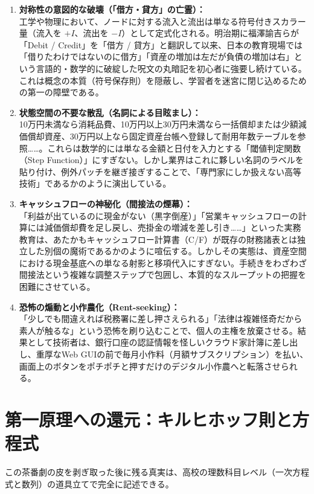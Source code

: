 \begin{enumerate}
    \item \textbf{対称性の意図的な破壊（「借方・貸方」の亡霊）：}\\
    工学や物理において、ノードに対する流入と流出は単なる符号付きスカラー量（流入を $+I$、流出を $-I$）として定式化される。明治期に福澤諭吉らが「Debit / Credit」を「借方 / 貸方」と翻訳して以来、日本の教育現場では「借りたわけではないのに借方」「資産の増加は左だが負債の増加は右」という言語的・数学的に破綻した呪文の丸暗記を初心者に強要し続けている。これは概念の本質（符号保存則）を隠蔽し、学習者を迷宮に閉じ込めるための第一の障壁である。

    \item \textbf{状態空間の不要な散乱（名詞による目眩まし）：}\\
    10万円未満なら消耗品費、10万円以上30万円未満なら一括償却または少額減価償却資産、30万円以上なら固定資産台帳へ登録して耐用年数テーブルを参照……。これらは数学的には単なる金額と日付を入力とする「閾値判定関数（Step Function）」にすぎない。しかし業界はこれに夥しい名詞のラベルを貼り付け、例外パッチを継ぎ接ぎすることで、「専門家にしか扱えない高等技術」であるかのように演出している。

    \item \textbf{キャッシュフローの神秘化（間接法の煙幕）：}\\
    「利益が出ているのに現金がない（黒字倒産）」「営業キャッシュフローの計算には減価償却費を足し戻し、売掛金の増減を差し引き……」といった実務教育は、あたかもキャッシュフロー計算書（C/F）が既存の財務諸表とは独立した別個の魔術であるかのように喧伝する。しかしその実態は、資産空間における現金基底への単なる射影と移項代入にすぎない。手続きをわざわざ間接法という複雑な調整ステップで包囲し、本質的なスループットの把握を困難にさせている。

    \item \textbf{恐怖の煽動と小作農化（Rent-seeking）：}\\
    「少しでも間違えれば税務署に差し押さえられる」「法律は複雑怪奇だから素人が触るな」という恐怖を刷り込むことで、個人の主権を放棄させる。結果として技術者は、銀行口座の認証情報を怪しいクラウド家計簿に差し出し、重厚なWeb GUIの前で毎月小作料（月額サブスクリプション）を払い、画面上のボタンをポチポチと押すだけのデジタル小作農へと転落させられる。
\end{enumerate}

\section{第一原理への還元：キルヒホッフ則と方程式}
この茶番劇の皮を剥ぎ取った後に残る真実は、高校の理数科目レベル（一次方程式と数列）の道具立てで完全に記述できる。

